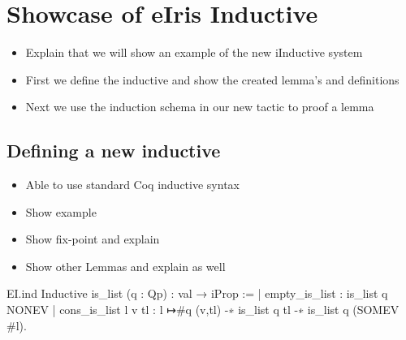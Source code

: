 \documentclass[thesis.tex]{subfiles}
\begin{document}
\chapter{Showcase of eIris Inductive}
\begin{itemize}
  \item Explain that we will show an example of the new iInductive system
  \item First we define the inductive and show the created lemma's and definitions
  \item Next we use the induction schema in our new tactic to proof a lemma
\end{itemize}
\section{Defining a new inductive}
\begin{itemize}
  \item Able to use standard Coq inductive syntax
  \item Show example
  \item Show fix-point and explain
  \item Show other Lemmas and explain as well
\end{itemize}
\begin{coqcode}
    EI.ind 
    Inductive is_list (q : Qp) : val → iProp :=
      | empty_is_list : is_list q NONEV
      | cons_is_list l v tl : 
        l ↦{#q} (v,tl) -∗ is_list q tl 
        -∗ is_list q (SOMEV #l).  
\end{coqcode}
\end{document}
